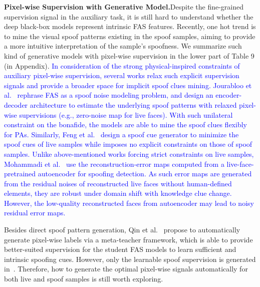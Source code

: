 \documentclass[10pt,journal,compsoc]{IEEEtran}
\begin{document}
\vspace{0.4em}
\noindent\textbf{Pixel-wise Supervision with Generative Model.}\quad   Despite the fine-grained supervision signal in the auxiliary task, it is still hard to understand whether the deep black-box models represent intrinsic FAS features. Recently, one hot trend is to mine the visual spoof patterns existing in the spoof samples, aiming to provide a more intuitive interpretation of the sample’s spoofness. We summarize such kind of generative models with pixel-wise supervision in the lower part of Table 9 (in Appendix). \textcolor{blue}{In consideration of the strong physical-inspired constraints of auxiliary pixel-wise supervision, several works relax such explicit supervision signals and provide a broader space for implicit spoof clues mining. Jourabloo et al.~\cite{jourabloo2018face} rephrase FAS as a spoof noise modeling problem, and design an encoder-decoder architecture to estimate the underlying spoof patterns with relaxed pixel-wise supervisions (e.g., zero-noise map for live faces). With such unilateral constraint on the bonafide, the models are able to mine the spoof clues flexibly for PAs. Similarly, Feng et al.~\cite{feng2020learning} design a spoof cue generator to minimize the spoof cues of live samples while imposes no explicit constraints on those of spoof samples. Unlike above-mentioned works forcing strict constraints on live samples, Mohammadi et al.~\cite{mohammadi2020improving} use the reconstruction-error maps computed from a live-face-pretrained autoencoder for spoofing detection. As such error maps are generated from the residual noises of reconstructed live faces without human-defined elements, they are robust under domain shift with knowledge clue change. However, the low-quality reconstructed faces from autoencoder may lead to noisy residual error maps.} 

Besides direct spoof pattern generation, Qin et al.~\cite{qin2021meta} propose to automatically generate pixel-wise labels via a meta-teacher framework, which is able to provide better-suited supervision for the student FAS models to learn sufficient and intrinsic spoofing cues. However, only the learnable spoof supervision is generated in~\cite{qin2021meta}. Therefore, how to generate the optimal pixel-wise signals automatically for both live and spoof samples is still worth exploring.


\end{document}
